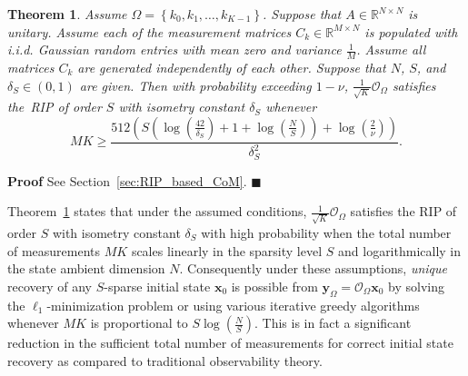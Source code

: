 \documentclass[11pt,draftcls,onecolumn]{IEEEtran}
\def\real    { \mathbb{R} }
\newtheorem{theorem}{Theorem}
\def \ok {{\mathcal{O}_{\Omega}}}
\newcommand{\vc}[1]{\boldsymbol{#1}}
\def\real    { \mathbb{R} }
\begin{document}
\begin{theorem}
Assume $\Omega = \left\{k_0, k_1, \dots, k_{K-1}\right\}$. Suppose that $A \in \real^{N \times N}$ is unitary.
Assume each of the measurement matrices $C_k \in \real^{M \times N}$ is populated with \ac{i.i.d.} Gaussian random entries with mean zero and variance $\frac{1}{M}$. Assume all matrices $C_k$ are generated independently of each other.
Suppose that $N$, $S$, and $\delta_S \in (0,1)$ are given.
Then with probability exceeding $1-\nu$, $\frac{1}{\sqrt{K}}\ok$ satisfies the~\ac{RIP} of order $S$ with isometry constant $\delta_S$ whenever
\begin{equation}
MK \geq \frac{512\left(S(\log(\frac{42}{\delta_S})+ 1 + \log(\frac{N}{S})) + \log(\frac{2}{\nu})\right)}{\delta_S^2}.\label{eq:res3}
\end{equation}
\label{theo:main_RIP_CoM_result_3}
\end{theorem}
{\textbf{Proof}} See Section~\ref{sec:RIP_based_CoM}. \hfill $\blacksquare$

Theorem~\ref{theo:main_RIP_CoM_result_3} states that under the assumed conditions, $\frac{1}{\sqrt{K}}\ok$ satisfies the \ac{RIP} of order $S$ with isometry constant $\delta_S$ with high probability when the total number of measurements $MK$ scales linearly in the sparsity level $S$ and logarithmically in the state ambient dimension $N$.
Consequently under these assumptions, \emph{unique} recovery of any $S$-sparse initial state $\vc{x}_0$ is possible from $\vc{y}_{\Omega} = \ok\vc{x}_0$ by solving the $\ell_1$-minimization problem or using various iterative greedy algorithms~\cite{tropp2007signal,needell2009cosamp} whenever $MK$ is proportional to $S\log(\frac{N}{S})$. This is in fact a significant reduction in the sufficient total number of measurements for correct initial state recovery as compared to traditional observability theory.
\end{document}
